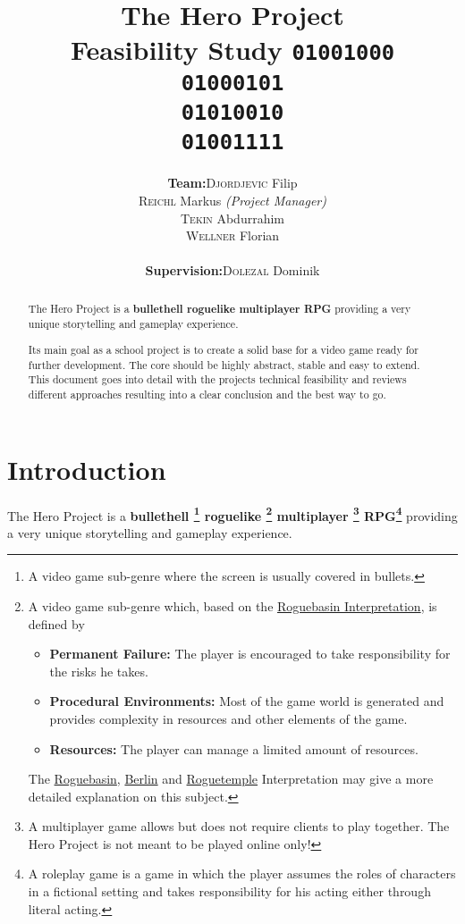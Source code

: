 \documentclass[11pt]{article}
\title{
  \textbf{The Hero Project}\\
  \large{Feasibility Study}
  \linebreak
  \linebreak
  \small{\texttt{01001000\\01000101\\01010010\\01001111}}
}
\author{
  \begin{tabular}{rl}
    \textbf{Team:}
    & \textsc{Djordjevic} Filip\\
    & \textsc{Reichl} Markus \small{\textit{(Project Manager)}}\\
    & \textsc{Tekin} Abdurrahim\\
    & \textsc{Wellner} Florian\\
    \\
    \textbf{Supervision:}
    & \textsc{Dolezal} Dominik
  \end{tabular}
}
\begin{document}
\begin{titlepage}
  \clearpage
  \maketitle
  \thispagestyle{empty}
  
  \begin{abstract}
    \begin{flushleft}
      The Hero Project is a \textbf{bullethell roguelike multiplayer RPG} providing a very unique storytelling and gameplay experience.
      
      Its main goal as a school project is to create a solid base for a video game ready for further development. The core should be highly abstract, stable and easy to extend.
      \linebreak
      \linebreak
      This document goes into detail with the projects technical feasibility and reviews different approaches resulting into a clear conclusion and the best way to go.
     \end{flushleft}
  \end{abstract}
\end{titlepage}

\tableofcontents
\newpage

\section{Introduction}
The Hero Project is a \textbf{
  bullethell
  \footnote{A video game sub-genre where the screen is usually covered in bullets.}
  roguelike
  \footnote{A video game sub-genre which, based on the \href{http://roguebasin.com/roguelike-definition}{Roguebasin Interpretation}, is defined by 
    \begin{itemize}
      \item \textbf{Permanent Failure:} The player is encouraged to take responsibility for the risks he takes.
      \item \textbf{Procedural Environments:} Most of the game world is generated and provides complexity in resources and other elements of the game.
      \item \textbf{Resources:} The player can manage a limited amount of resources.
    \end{itemize}
    The \href{http://roguebasin.com/roguelike-definition}{Roguebasin}, \href{http://roguebasin.com/index.php?title=Berlin_Interpretation}{Berlin} and \href{http://roguetemple.com/roguelike-definition}{Roguetemple} Interpretation may give a more detailed explanation on this subject.
  }
  multiplayer
  \footnote{A multiplayer game allows but does not require clients to play together. The Hero Project is not meant to be played online only!}
  RPG\footnote{A roleplay game is a game in which the player assumes the roles of characters in a fictional setting and takes responsibility for his acting either through literal acting.}
} providing a very unique storytelling and gameplay experience.
\end{document}
